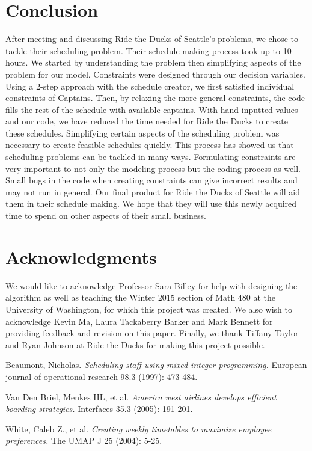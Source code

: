\documentclass[12pt]{article}
\begin{document}
\section*{Conclusion}
After meeting and discussing Ride the Ducks of Seattle's problems, we chose to tackle their scheduling problem. Their schedule making process took up to 10 hours. We started by understanding the problem then simplifying aspects of the problem for our model. Constraints were designed through our decision variables. Using a 2-step approach with the schedule creator, we first satisfied individual constraints of Captains. Then, by relaxing the more general constraints, the code fills the rest of the schedule with available captains. With hand inputted values and our code, we have reduced the time needed for Ride the Ducks to create these schedules. Simplifying certain aspects of the scheduling problem was necessary to create feasible schedules quickly. This process has showed us that scheduling problems can be tackled in many ways. Formulating constraints are very important to not only the modeling process but the coding process as well. Small bugs in the code when creating constraints can give incorrect results and may not run in general. Our final product for Ride the Ducks of Seattle will aid them in their schedule making. We hope that they will use this newly acquired time to spend on other aspects of their small business.

\section*{Acknowledgments}
We would like to acknowledge Professor Sara Billey for help with designing the algorithm as well as teaching the Winter 2015 section of Math 480 at the University of Washington, for which this project was created. We also wish to acknowledge Kevin Ma, Laura Tackaberry Barker and Mark Bennett for providing feedback and revision on this paper. Finally, we thank Tiffany Taylor and Ryan Johnson at Ride the Ducks for making this project possible. 


\begin{thebibliography}{9}
Beaumont, Nicholas. \emph{Scheduling staff using mixed integer programming.} European journal of operational research 98.3 (1997): 473-484.

 Van Den Briel, Menkes HL, et al. \emph{America west airlines develops efficient boarding strategies.} Interfaces 35.3 (2005): 191-201.

White, Caleb Z., et al. \emph{Creating weekly timetables to maximize employee preferences.} The UMAP J 25 (2004): 5-25.


\end{thebibliography}
\end{document}
